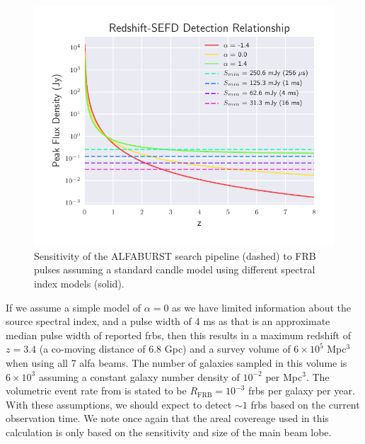\documentclass[a4paper,fleqn,usenatbib]{mnras}
\begin{document}
\begin{figure}
    \includegraphics[width=1.0\linewidth]{figures/fwhm_sefd_z_relation.pdf}
    \caption{Sensitivity of the ALFABURST search pipeline (dashed) to FRB pulses
    assuming a standard candle model using different spectral index models
    (solid).
    }
    \label{fig:fwhm_sefd_z}
\end{figure}

If we assume a simple model of $\alpha=0$ as we have limited information about
the source spectral index, and a pulse width of 4 ms as that is an approximate
median pulse width of reported \glspl{frb}, then this results in a maximum
redshift of $z=3.4$ (a co-moving distance of 6.8 Gpc) and a survey volume of $6
\times 10^5$ Mpc$^3$ when using all 7 \gls{alfa} beams. The number of galaxies
sampled in this volume is $6 \times 10^3$ assuming a constant galaxy number
density of $10^{-2}$ per Mpc$^3$.  The volumetric event rate from
\cite{2013Sci...341...53T} is stated to be $R_{\textrm{FRB}} = 10^{-3}$
\glspl{frb} per galaxy per year. With these assumptions, we should expect to
detect $\sim 1$ \glspl{frb} based on the current observation time. We note once
again that the areal covereage used in this calculation is only based on the
sensitivity and size of the main beam lobe.

\end{document}
